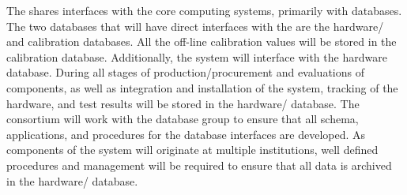 The   shares interfaces with the  core computing systems, primarily with databases. The two databases that will have direct interfaces with the    are the hardware/ and calibration databases. All the off-line calibration values will be stored in the  calibration database. Additionally, the system will interface with the  hardware database. During all stages of production/procurement and  evaluations of  components, as well as integration and installation of the system, tracking of the hardware, and test results will be stored in the  hardware/ database. The   consortium will work with the database group to ensure that all schema, applications, and procedures for the database interfaces are developed. As components of the system will originate at multiple institutions, well defined procedures and management will be required to ensure that all data is archived in the  hardware/ database. 

